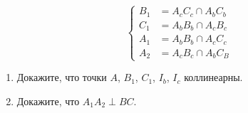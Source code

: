 \begin{enumerate}[resume*]
    \begin{equation*}
        \begin{cases}
            B_1 &= A_cC_c \cap A_bC_b \\
            C_1 &= A_bB_b \cap A_cB_c \\
            A_1 &= A_bB_b \cap A_cC_c \\
            A_2 &= A_cB_c \cap A_bC_B
        \end{cases}
    \end{equation*}

    \begin{enumerate}
        \item Докажите, что точки $A$, $B_1$, $C_1$, $I_b$, $I_c$ коллинеарны.

        \item Докажите, что \(A_1A_2 \perp BC\).
    \end{enumerate}
\end{enumerate}
